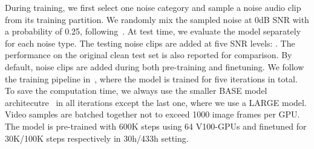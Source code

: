 During training, we first select one noise category and sample a noise audio clip from its training partition. We randomly mix the sampled noise at 0dB SNR with a probability of 0.25, following~\cite{Xu2020DiscriminativeMS}. At test time, we evaluate the model separately for each noise type. The testing noise clips are added at five SNR levels: . The performance on the original clean test set is also reported for comparison. 
By default, noise clips are added during both pre-training and finetuning. We follow the training pipeline in~\cite{avhubert}, where the model is trained for five iterations in total. To save the computation time, we always use the smaller BASE model architecutre~\cite{avhubert} in all iterations except the last one, where we use a LARGE model. Video samples are batched together not to exceed 1000 image frames per GPU. The model is pre-trained with 600K steps using 64 V100-GPUs and finetuned for 30K/100K steps respectively in 30h/433h setting.


